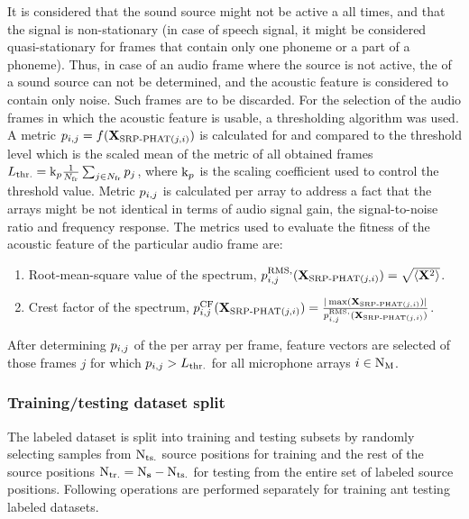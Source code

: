 \documentclass[applsci,article,submit,moreauthors,pdftex]{Definitions/mdpi}
\begin{document}
It is considered that the sound source might not be active a all times, and that the signal is non-stationary (in case of speech signal, it might be considered quasi-stationary for frames that contain only one phoneme or a part of a phoneme). Thus, in case of an audio frame where the source is not active, the \doa{} of a sound source can not be determined, and the acoustic feature is considered to contain only noise. Such frames are to be discarded. For the selection of the audio frames in which the acoustic feature is usable, a thresholding algorithm was used. 
A metric 
$ p{}_{i,j} = f(\mathbf{X}_{\text{SRP-PHAT}(j,i)}) $ 
is calculated for and compared to the threshold level \thrlevel{} which is the scaled mean  of the metric of all obtained frames 
$ L_{\mathrm{thr.}} = \mathrm{k}_{p} \frac{1}{N_{\mathrm{fr}}}\sum_{j\in N_{\mathrm{fr}}} p{}_{j}  $, 
where $ \mathrm{k}_{p} $ is the scaling coefficient used to control the threshold value.
Metric $ p{}_{i,j} $ is calculated per array to address a fact that the arrays might be not identical in terms of audio signal gain, the signal-to-noise ratio and frequency response.
The metrics used to evaluate the fitness of the acoustic feature of the particular audio frame are: 
\begin{enumerate}
	\item Root-mean-square  value of the \srpphat{} spectrum, $ p^{\mathrm{RMS},}_{i,j}(\mathbf{X}_{\text{SRP-PHAT}(j,i)}) = \sqrt{ \langle \mathbf{X}^2 \rangle } $. 
	\item Crest factor of the \srpphat{} spectrum, $ p^{\mathrm{CF}}_{i,j}(\mathbf{X}_{\text{SRP-PHAT}(j,i)}) = \frac{| \max(\mathbf{X}_{\text{SRP-PHAT}(j,i)}) |}{p^{\mathrm{RMS},}_{i,j}(\mathbf{X}_{\text{SRP-PHAT}(j,i)})} $.
\end{enumerate}

After determining $ p{}_{i,j} $ of the \SRPspectrum{} per array per frame, feature vectors \SRPfeature{} are selected of those frames $ j $ for which $ p{}_{i,j} > L_{\mathrm{thr.}} $ for all microphone arrays $ i \in \mathrm{N}_{\mathrm{M}} $.


\subsubsection{Training/testing dataset split}
The labeled dataset is split into training and testing subsets by randomly selecting samples from  $ \mathrm{N}_{\mathrm{ts.}} $ source positions for training and the rest of the source positions $ \mathrm{N}_{\mathrm{tr.}} = \mathrm{N}_{\mathbf{s}} - \mathrm{N}_{\mathrm{ts.}} $ for testing from the entire set of labeled source positions.
Following operations are performed separately for training ant testing labeled datasets.
\end{document}
